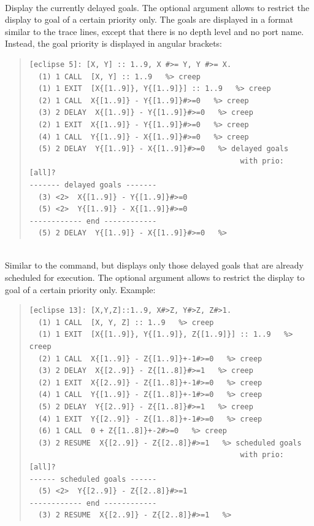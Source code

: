 \begin{descr}{1cm}

\\
Display the currently delayed goals. The optional argument allows
to restrict the display to goal of a certain priority only.
The goals are displayed in a format similar to the trace lines,
except that there is no depth level and no port name.
Instead, the goal priority is displayed in angular brackets:
\begin{quote}
\begin{verbatim}
[eclipse 5]: [X, Y] :: 1..9, X #>= Y, Y #>= X.
  (1) 1 CALL  [X, Y] :: 1..9   %> creep
  (1) 1 EXIT  [X{[1..9]}, Y{[1..9]}] :: 1..9   %> creep
  (2) 1 CALL  X{[1..9]} - Y{[1..9]}#>=0   %> creep
  (3) 2 DELAY  X{[1..9]} - Y{[1..9]}#>=0   %> creep
  (2) 1 EXIT  X{[1..9]} - Y{[1..9]}#>=0   %> creep
  (4) 1 CALL  Y{[1..9]} - X{[1..9]}#>=0   %> creep
  (5) 2 DELAY  Y{[1..9]} - X{[1..9]}#>=0   %> delayed goals
                                                with prio: [all]?
------- delayed goals -------
  (3) <2>  X{[1..9]} - Y{[1..9]}#>=0
  (5) <2>  Y{[1..9]} - X{[1..9]}#>=0
------------ end ------------
  (5) 2 DELAY  Y{[1..9]} - X{[1..9]}#>=0   %>
\end{verbatim}
\end{quote}

\\
Similar to the  command, but displays only those delayed goals
that are already scheduled for execution.
The optional argument allows
to restrict the display to goal of a certain priority only. Example:
\begin{quote}
\begin{verbatim}
[eclipse 13]: [X,Y,Z]::1..9, X#>Z, Y#>Z, Z#>1.
  (1) 1 CALL  [X, Y, Z] :: 1..9   %> creep
  (1) 1 EXIT  [X{[1..9]}, Y{[1..9]}, Z{[1..9]}] :: 1..9   %> creep
  (2) 1 CALL  X{[1..9]} - Z{[1..9]}+-1#>=0   %> creep
  (3) 2 DELAY  X{[2..9]} - Z{[1..8]}#>=1   %> creep
  (2) 1 EXIT  X{[2..9]} - Z{[1..8]}+-1#>=0   %> creep
  (4) 1 CALL  Y{[1..9]} - Z{[1..8]}+-1#>=0   %> creep
  (5) 2 DELAY  Y{[2..9]} - Z{[1..8]}#>=1   %> creep
  (4) 1 EXIT  Y{[2..9]} - Z{[1..8]}+-1#>=0   %> creep
  (6) 1 CALL  0 + Z{[1..8]}+-2#>=0   %> creep
  (3) 2 RESUME  X{[2..9]} - Z{[2..8]}#>=1   %> scheduled goals
                                                with prio: [all]?
------ scheduled goals ------
  (5) <2>  Y{[2..9]} - Z{[2..8]}#>=1
------------ end ------------
  (3) 2 RESUME  X{[2..9]} - Z{[2..8]}#>=1   %>
\end{verbatim}
\end{quote}


\end{descr}
